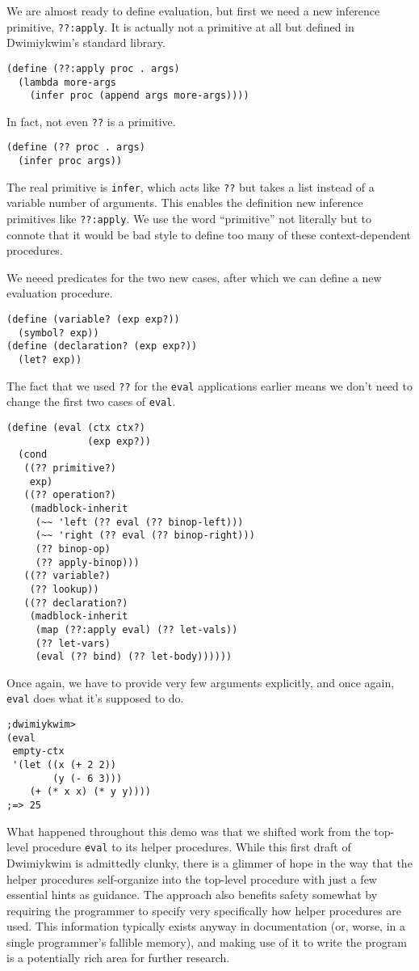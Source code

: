 \documentclass[11pt]{article}
\begin{document}
We are almost ready to define evaluation,
but first we need a new inference primitive, \texttt{??:apply}.
It is actually not a primitive at all
but defined in Dwimiykwim's standard library.
\begin{Verbatim}
(define (??:apply proc . args)
  (lambda more-args
    (infer proc (append args more-args))))
\end{Verbatim}
In fact, not even \texttt{??} is a primitive.
\begin{Verbatim}
(define (?? proc . args)
  (infer proc args))
\end{Verbatim}
The real primitive is \texttt{infer},
which acts like \texttt{??}
but takes a list instead of a variable number of arguments.
This enables the definition new inference primitives like \texttt{??:apply}.
We use the word ``primitive'' not literally
but to connote that it would be bad style to define too many of these
context-dependent procedures.

We neeed predicates for the two new cases,
after which we can define a new evaluation procedure.
\begin{Verbatim}
(define (variable? (exp exp?))
  (symbol? exp))
(define (declaration? (exp exp?))
  (let? exp))
\end{Verbatim}
The fact that we used \texttt{??} for the \texttt{eval} applications earlier
means we don't need to change the first two cases of \texttt{eval}.
\begin{Verbatim}
(define (eval (ctx ctx?)
              (exp exp?))
  (cond
   ((?? primitive?)
    exp)
   ((?? operation?)
    (madblock-inherit
     (~~ 'left (?? eval (?? binop-left)))
     (~~ 'right (?? eval (?? binop-right)))
     (?? binop-op)
     (?? apply-binop)))
   ((?? variable?)
    (?? lookup))
   ((?? declaration?)
    (madblock-inherit
     (map (??:apply eval) (?? let-vals))
     (?? let-vars)
     (eval (?? bind) (?? let-body))))))
\end{Verbatim}
Once again, we have to provide very few arguments explicitly,
and once again, \texttt{eval} does what it's supposed to do.
\begin{Verbatim}
;dwimiykwim>
(eval
 empty-ctx
 '(let ((x (+ 2 2))
        (y (- 6 3)))
    (+ (* x x) (* y y))))
;=> 25
\end{Verbatim}

What happened throughout this demo was that we shifted work from
the top-level procedure \texttt{eval} to its helper procedures.
While this first draft of Dwimiykwim is admittedly clunky,
there is a glimmer of hope in the way that the helper procedures
self-organize into the top-level procedure
with just a few essential hints as guidance.
The approach also benefits safety somewhat
by requiring the programmer to specify very specifically
how helper procedures are used.
This information typically exists anyway in documentation
(or, worse, in a single programmer's fallible memory),
and making use of it to write the program
is a potentially rich area for further research.
\end{document}
